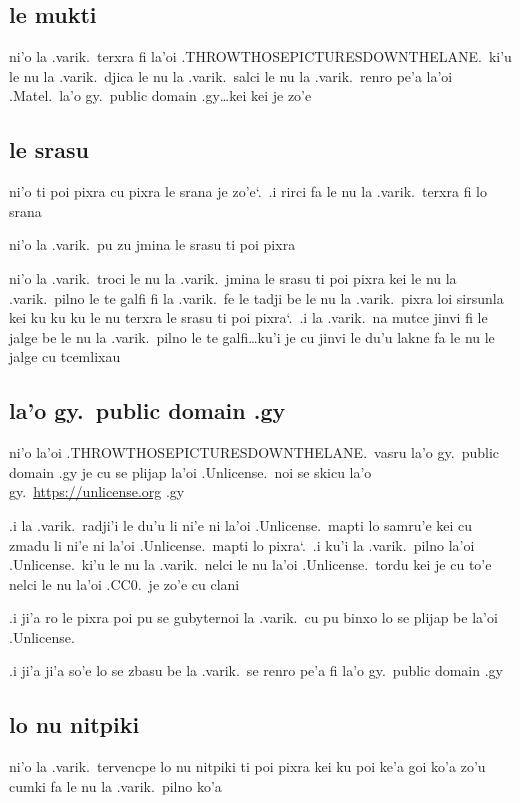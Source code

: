 \documentclass{report}
\newcommand\sds{\spacefactor\sfcode`.\ \space}
\begin{document}
\subsection{le mukti}
ni'o la .varik.\ terxra fi la'oi .THROWTHOSEPICTURESDOWNTHELANE.\ ki'u le nu la .varik.\ djica le nu la .varik.\ salci le nu la .varik.\ renro pe'a la'oi .Matel.\ la'o gy.\ public domain .gy\ldots kei kei je zo'e

\subsection{le srasu}
ni'o ti poi pixra cu pixra le srana je zo'e\sds  .i rirci fa le nu la .varik.\ terxra fi lo srana

ni'o la .varik.\ pu zu jmina le srasu ti poi pixra

ni'o la .varik.\ troci le nu la .varik.\ jmina le srasu ti poi pixra kei le nu la .varik.\ pilno le te galfi fi la .varik.\ fe le tadji be le nu la .varik.\ pixra loi sirsunla kei ku ku ku le nu terxra le srasu ti poi pixra\sds  .i la .varik.\ na mutce jinvi fi le jalge be le nu la .varik.\ pilno le te galfi\ldots ku'i je cu jinvi le du'u lakne fa le nu le jalge cu tcemlixau

\subsection{la'o gy.\ public domain .gy}
ni'o la'oi .THROWTHOSEPICTURESDOWNTHELANE.\ vasru la'o gy.\ public domain .gy je cu se plijap la'oi .Unlicense.\ noi se skicu la'o gy.\ \url{https://unlicense.org} .gy

.i la .varik.\ radji'i le du'u li ni'e ni la'oi .Unlicense.\ mapti lo samru'e kei cu zmadu li ni'e ni la'oi .Unlicense.\ mapti lo pixra\sds  .i ku'i la .varik.\ pilno la'oi .Unlicense.\ ki'u le nu la .varik.\ nelci le nu la'oi .Unlicense.\ tordu kei je cu to'e nelci le nu la'oi .CC0.\ je zo'e cu clani

.i ji'a ro le pixra poi pu se gubyternoi la .varik.\ cu pu binxo lo se plijap be la'oi .Unlicense.

.i ji'a ji'a so'e lo se zbasu be la .varik.\ se renro pe'a fi la'o gy.\ public domain .gy

\subsection{lo nu nitpiki}
ni'o la .varik.\ tervencpe lo nu nitpiki ti poi pixra kei ku poi ke'a goi ko'a zo'u cumki fa le nu la .varik.\ pilno ko'a
\end{document}
